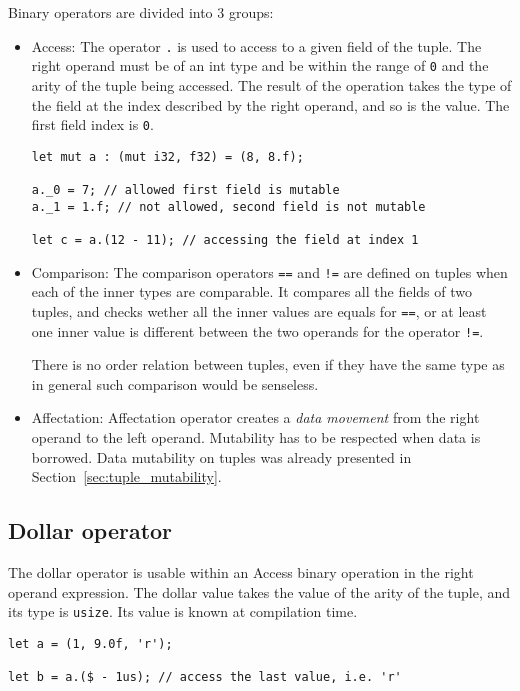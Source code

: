 Binary operators are divided into 3 groups:
\begin{itemize}
\item Access: The operator \texttt{.} is used to access to a given field of the
  tuple. The right operand must be of an int type and be within the range of
  \texttt{0} and the arity of the tuple being accessed. The result of the
  operation takes the type of the field at the index described by the right
  operand, and so is the value. The first field index is \texttt{0}.

  \begin{lstlisting}[style=coloredverbatim, linewidth=0.95\linewidth]
let mut a : (mut i32, f32) = (8, 8.f);

a._0 = 7; // allowed first field is mutable
a._1 = 1.f; // not allowed, second field is not mutable

let c = a.(12 - 11); // accessing the field at index 1
  \end{lstlisting}

\item Comparison: The comparison operators \texttt{==} and \texttt{!=} are
  defined on tuples when each of the inner types are comparable. It compares all
  the fields of two tuples, and checks wether all the inner values are equals
  for \texttt{==}, or at least one inner value is different between the two
  operands for the operator \texttt{!=}.

  There is no order relation between tuples, even if they have the same type as
  in general such comparison would be senseless.

\item Affectation: Affectation operator creates a \textit{data movement} from
  the right operand to the left operand. Mutability has to be respected when
  data is borrowed. Data mutability on tuples was already presented in
  Section~\ref{sec:tuple_mutability}.

\end{itemize}

\subsection {Dollar operator}

The dollar operator is usable within an Access binary operation in the right
operand expression. The dollar value takes the value of the arity of the tuple,
and its type is \texttt{usize}. Its value is known at compilation time.

\begin{lstlisting}[style=coloredverbatim]
let a = (1, 9.0f, 'r');

let b = a.($ - 1us); // access the last value, i.e. 'r'
\end{lstlisting}

